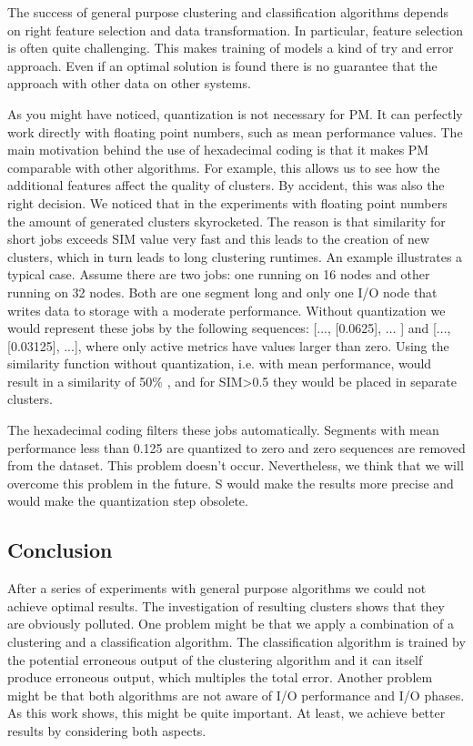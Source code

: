 \documentclass[]{llncs}
\begin{document}
{{{{The success of general purpose clustering and classification algorithms depends on right feature selection and data transformation.
In particular, feature selection is often quite challenging.
This makes training of models a kind of try and error approach.
Even if an optimal solution is found there is no guarantee that the approach with other data on other systems.

As you might have noticed, quantization is not necessary for PM.
It can perfectly work directly with floating point numbers, such as mean performance values.
The main motivation behind the use of hexadecimal coding is that it makes PM comparable with other algorithms.
For example, this allows us to see how the additional features affect the quality of clusters.
By accident, this was also the right decision.
We noticed that in the experiments with floating point numbers the amount of generated clusters skyrocketed.
The reason is that similarity for short jobs exceeds SIM value very fast and this leads to the creation of new clusters, which in turn leads to long clustering runtimes.
An example illustrates a typical case.
Assume there are two jobs: one running on 16 nodes and other running on 32 nodes.
Both are one segment long and only one I/O node that writes data to storage with a moderate performance.
Without quantization we would represent these jobs by the following sequences:  [..., [0.0625], $ \ldots $ ] and [..., [0.03125], ...], where only active metrics have values larger than zero.
Using the similarity function without quantization, i.e.
with mean performance, would result in a similarity of 50$\%$ , and for SIM>0.5 they would be placed in separate clusters.

The hexadecimal coding filters these jobs automatically. Segments with mean performance less than 0.125 are quantized to zero and zero sequences are removed from the dataset. This problem doesn't occur.
Nevertheless, we think that we will overcome this problem in the future.
S would make the results more precise and would make the quantization step
obsolete.

\subsection{Conclusion}
After a series of experiments with general purpose algorithms we could not achieve optimal results.
The investigation of resulting clusters shows that they are obviously polluted.
One problem might be that we apply a combination of a clustering and a classification algorithm.
The classification algorithm is trained by the potential erroneous output of the clustering algorithm and it can itself produce erroneous output, which multiples the total error.
Another problem might be that both algorithms are not aware of I/O performance and I/O phases.
As this work shows, this might be quite important.
At least, we achieve better results by considering both aspects.


}}}}
\end{document}
